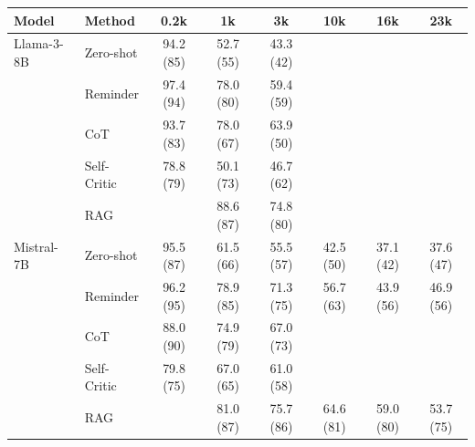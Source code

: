 \begin{tabular}{llcccccc}
\toprule
Model & Method & 0.2k & 1k & 3k & 10k & 16k & 23k \\
\midrule
Llama-3-8B & Zero-shot & 94.2 (85) & 52.7 (55) & 43.3 (42) &  &  &  \\
 & Reminder & 97.4 (94) & 78.0 (80) & 59.4 (59) &  &  &  \\
 & CoT & 93.7 (83) & 78.0 (67) & 63.9 (50) &  &  &  \\
 & Self-Critic & 78.8 (79) & 50.1 (73) & 46.7 (62) &  &  &  \\
 & RAG &  & 88.6 (87) & 74.8 (80) &  &  &  \\
\midrule
Mistral-7B & Zero-shot & 95.5 (87) & 61.5 (66) & 55.5 (57) & 42.5 (50) & 37.1 (42) & 37.6 (47) \\
 & Reminder & 96.2 (95) & 78.9 (85) & 71.3 (75) & 56.7 (63) & 43.9 (56) & 46.9 (56) \\
 & CoT & 88.0 (90) & 74.9 (79) & 67.0 (73) &  &  &  \\
 & Self-Critic & 79.8 (75) & 67.0 (65) & 61.0 (58) &  &  &  \\
 & RAG &  & 81.0 (87) & 75.7 (86) & 64.6 (81) & 59.0 (80) & 53.7 (75) \\
\bottomrule
\end{tabular}
